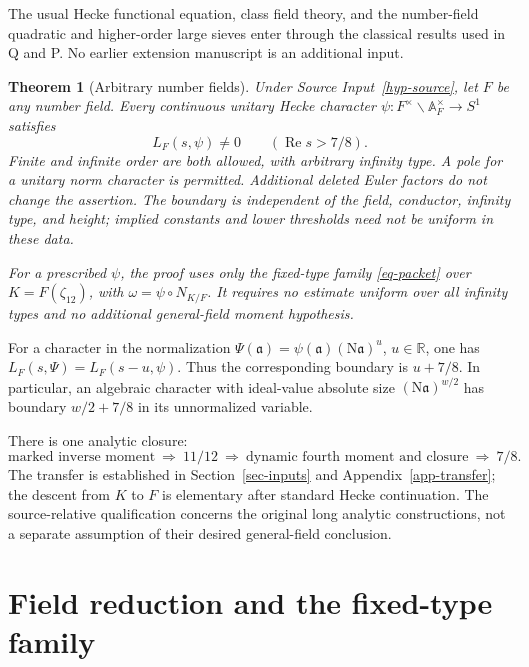 \documentclass[11pt,a4paper]{article}
\newtheorem{theorem}{Theorem}[section]
\theoremstyle{remark}\newtheorem{remark}[theorem]{Remark}
\newcommand{\N}{\mathrm N}
\newcommand{\Rea}{\operatorname{Re}}
\numberwithin{equation}{section}
\begin{document}
The usual Hecke functional equation, class field theory, and the
number-field quadratic and higher-order large sieves enter through
the classical results used in Q and P. No earlier extension
manuscript is an additional input.

\begin{theorem}[Arbitrary number fields]\label{thm-main}
Under Source Input~\ref{hyp-source}, let $F$ be any number field.
Every continuous unitary Hecke character
$\psi:F^\times\backslash\mathbb A_F^\times\longrightarrow S^1$
satisfies
\begin{equation}\label{eq-main}
 \boxed{L_F(s,\psi)\ne0\qquad(\Rea s>7/8).}
\end{equation}
Finite and infinite order are both allowed, with arbitrary infinity
type. A pole for a unitary norm character is permitted. Additional
deleted Euler factors do not change the assertion. The boundary is
independent of the field, conductor, infinity type, and height;
implied constants and lower thresholds need not be uniform in these
data.

For a prescribed $\psi$, the proof uses only the fixed-type family
\eqref{eq-packet} over $K=F(\zeta_{12})$, with
$\omega=\psi\circ N_{K/F}$. It requires no estimate uniform over
all infinity types and no additional general-field moment hypothesis.
\end{theorem}

For a character in the normalization
$\Psi(\mathfrak a)=\psi(\mathfrak a)(\N\mathfrak a)^u$,
$u\in\mathbb R$, one has $L_F(s,\Psi)=L_F(s-u,\psi)$.
Thus the corresponding boundary is $u+7/8$. In particular,
an algebraic character with ideal-value absolute size
$(\N\mathfrak a)^{w/2}$ has boundary $w/2+7/8$ in its
unnormalized variable.

There is one analytic closure:
\[
 \text{marked inverse moment}\ \Longrightarrow\ 11/12
 \ \Longrightarrow\ \text{dynamic fourth moment and closure}
 \ \Longrightarrow\ 7/8.
\]
The transfer is established in Section~\ref{sec-inputs} and
Appendix~\ref{app-transfer}; the descent from $K$ to $F$ is
elementary after standard Hecke continuation. The source-relative
qualification concerns the original long analytic constructions,
not a separate assumption of their desired general-field conclusion.

\section{Field reduction and the fixed-type family}\label{sec-reduction}
\end{document}
